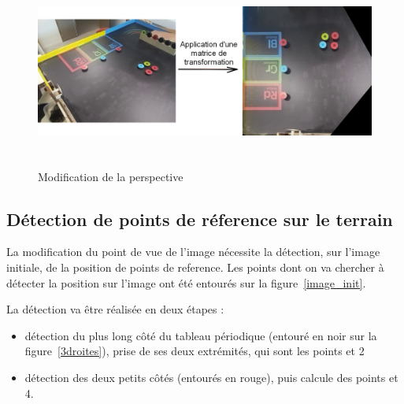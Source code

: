\documentclass{article}
\begin{document}
\begin{figure}[!h]
\begin{center} 
\includegraphics[height=180pt]{application_matrice.png}  
\end{center}
\caption{Modification de la perspective}
\label{application_matrice}
\end{figure}

\subsection{Détection de points de réference sur le terrain}
La modification du point de vue de l'image nécessite la détection, sur l'image initiale, de la position de points de reference. Les points dont on va chercher à 
détecter la position sur l'image ont été entourés sur la figure~\ref{image_init}.

La détection va être réalisée en deux étapes :
\begin{itemize}
\item détection du plus long côté du tableau périodique (entouré en noir sur la figure~\ref{3droites}), prise de ses deux extrémités, qui sont les points  et 2
\item détection des deux petits côtés (entourés en rouge), puis calcule des points  et 4.
\end{itemize}
\end{document}
